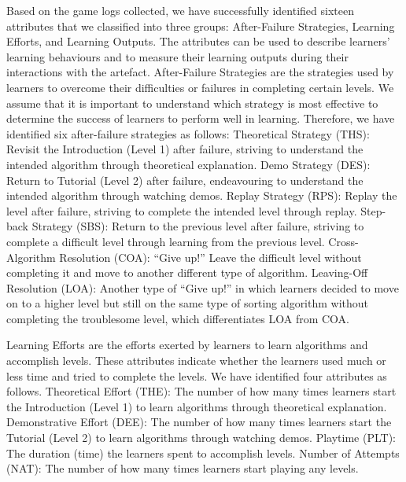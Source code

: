 \documentclass[conference]{IEEEtran}
\begin{document}
Based on the game logs collected, we have successfully identified sixteen attributes that we classified into three groups: After-Failure Strategies, Learning Efforts, and Learning Outputs. The attributes can be used to describe learners’ learning behaviours and to measure their learning outputs during their interactions with the artefact. 
After-Failure Strategies are the strategies used by learners to overcome their difficulties or failures in completing certain levels. We assume that it is important to understand which strategy is most effective to determine the success of learners to perform well in learning. Therefore, we have identified six after-failure strategies as follows: Theoretical Strategy (THS): Revisit the Introduction (Level 1) after failure, striving to understand the intended algorithm through theoretical explanation. Demo Strategy (DES): Return to Tutorial (Level 2) after failure, endeavouring to understand the intended algorithm through watching demos. Replay Strategy (RPS): Replay the level after failure, striving to complete the intended level through replay. Step-back Strategy (SBS): Return to the previous level after failure, striving to complete a difficult level through learning from the previous level. Cross-Algorithm Resolution (COA): ``Give up!'' Leave the difficult level without completing it and move to another different type of algorithm. Leaving-Off Resolution (LOA): Another type of “Give up!” in which learners decided to move on to a higher level but still on the same type of sorting algorithm without completing the troublesome level, which differentiates LOA from COA.


Learning Efforts are the efforts exerted by learners to learn algorithms and accomplish levels. These attributes indicate whether the learners used much or less time and tried to complete the levels. We have identified four attributes as follows. Theoretical Effort (THE): The number of how many times learners start the Introduction (Level 1) to learn algorithms through theoretical explanation. Demonstrative Effort (DEE): The number of how many times learners start the Tutorial (Level 2) to learn algorithms through watching demos. Playtime (PLT): The duration (time) the learners spent to accomplish levels. Number of Attempts (NAT): The number of how many times learners start playing any levels.
\end{document}
